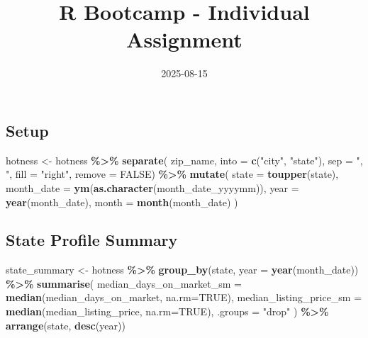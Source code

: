 \documentclass[
]{article}
\title{R Bootcamp - Individual Assignment}
\author{}
\date{\vspace{-2.5em}2025-08-15}
\newenvironment{Shaded}{\begin{snugshade}}{\end{snugshade}}
\newcommand{\AttributeTok}[1]{\textcolor[rgb]{0.13,0.29,0.53}{#1}}
\newcommand{\ConstantTok}[1]{\textcolor[rgb]{0.56,0.35,0.01}{#1}}
\newcommand{\FunctionTok}[1]{\textcolor[rgb]{0.13,0.29,0.53}{\textbf{#1}}}
\newcommand{\NormalTok}[1]{#1}
\newcommand{\OtherTok}[1]{\textcolor[rgb]{0.56,0.35,0.01}{#1}}
\newcommand{\SpecialCharTok}[1]{\textcolor[rgb]{0.81,0.36,0.00}{\textbf{#1}}}
\newcommand{\StringTok}[1]{\textcolor[rgb]{0.31,0.60,0.02}{#1}}
\begin{document}
\maketitle

\subsection{Setup}\label{setup}

\begin{Shaded}
\begin{Highlighting}[]
\NormalTok{hotness }\OtherTok{\textless{}{-}}\NormalTok{ hotness }\SpecialCharTok{\%\textgreater{}\%}
  \FunctionTok{separate}\NormalTok{(}
\NormalTok{    zip\_name, }
    \AttributeTok{into =} \FunctionTok{c}\NormalTok{(}\StringTok{"city"}\NormalTok{, }\StringTok{"state"}\NormalTok{), }
    \AttributeTok{sep =} \StringTok{", "}\NormalTok{, }
    \AttributeTok{fill =} \StringTok{"right"}\NormalTok{, }
    \AttributeTok{remove =} \ConstantTok{FALSE}\NormalTok{) }\SpecialCharTok{\%\textgreater{}\%}
  \FunctionTok{mutate}\NormalTok{(}
    \AttributeTok{state =} \FunctionTok{toupper}\NormalTok{(state),}
    \AttributeTok{month\_date =} \FunctionTok{ym}\NormalTok{(}\FunctionTok{as.character}\NormalTok{(month\_date\_yyyymm)),}
    \AttributeTok{year =} \FunctionTok{year}\NormalTok{(month\_date),}
    \AttributeTok{month  =} \FunctionTok{month}\NormalTok{(month\_date)}
\NormalTok{  )}
\end{Highlighting}
\end{Shaded}

\subsection{State Profile Summary}\label{state-profile-summary}

\begin{Shaded}
\begin{Highlighting}[]
\NormalTok{state\_summary }\OtherTok{\textless{}{-}}\NormalTok{ hotness }\SpecialCharTok{\%\textgreater{}\%}
  \FunctionTok{group\_by}\NormalTok{(state, }\AttributeTok{year =} \FunctionTok{year}\NormalTok{(month\_date)) }\SpecialCharTok{\%\textgreater{}\%}
  \FunctionTok{summarise}\NormalTok{(}
    \AttributeTok{median\_days\_on\_market\_sm =} \FunctionTok{median}\NormalTok{(median\_days\_on\_market, }\AttributeTok{na.rm=}\ConstantTok{TRUE}\NormalTok{),}
    \AttributeTok{median\_listing\_price\_sm =} \FunctionTok{median}\NormalTok{(median\_listing\_price, }\AttributeTok{na.rm=}\ConstantTok{TRUE}\NormalTok{),}
    \AttributeTok{.groups =} \StringTok{"drop"}
\NormalTok{  ) }\SpecialCharTok{\%\textgreater{}\%}
  \FunctionTok{arrange}\NormalTok{(state, }\FunctionTok{desc}\NormalTok{(year))}
\end{Highlighting}
\end{Shaded}
\end{document}
